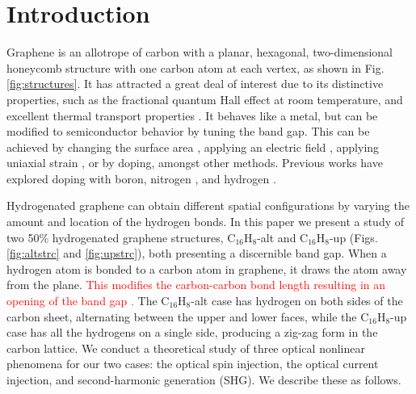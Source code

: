 \documentclass[pss]{wiley2sp} %
\begin{document}
\maketitle


\section{Introduction}\label{sec:intro}

Graphene is an allotrope of carbon with a planar, hexagonal, two-dimensional
honeycomb structure with one carbon atom at each vertex, as shown in Fig.
\ref{fig:structures}. It has attracted a great deal of interest due to its
distinctive properties, such as the fractional quantum Hall effect at room
temperature, and excellent thermal transport properties
\cite{geimNM07,reinaNL08,novoselov2S7,balandinNL08}. It behaves like a metal,
but can be modified to semiconductor behavior by tuning the band gap. This can
be achieved by changing the surface area \cite{hanPRL07}, applying an electric
field \cite{zhangN09}, applying uniaxial strain \cite{niACSN08}, or by doping,
amongst other methods. Previous works have explored doping with boron,
nitrogen \cite{guoIJ11}, and hydrogen
\cite{eliasS09,guisingerNL09,samarakoonACSN10}.

Hydrogenated graphene can obtain different spatial configurations by varying
the amount and location of the hydrogen bonds. In this paper we present a
study of two 50\% hydrogenated graphene structures, C$_{16}$H$_{8}$-alt and
C$_{16}$H$_{8}$-up (Figs. \ref{fig:altstrc} and \ref{fig:upstrc}), both
presenting a discernible band gap. When a hydrogen atom is bonded to a carbon
atom in graphene, it draws the atom away from the plane. 
\textcolor{red}{
This modifies the
carbon-carbon bond length resulting in an opening of the band gap
\cite{eliasS09,boukhvalovPRB08}. 
}
The C$_{16}$H$_{8}$-alt case has hydrogen on
both sides of the carbon sheet, alternating between the upper and lower faces,
while the C$_{16}$H$_{8}$-up case has all the hydrogens on a single side,
producing a zig-zag form in the carbon lattice. We conduct a theoretical study
of three optical nonlinear phenomena for our two cases: the optical spin
injection, the optical current injection, and second-harmonic generation
(SHG). We describe these as follows.
\end{document}
